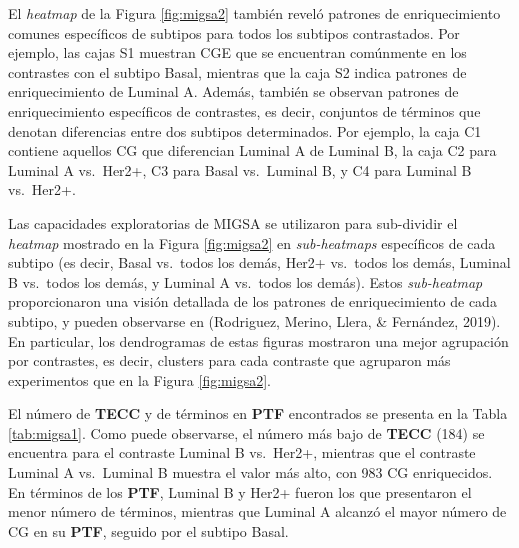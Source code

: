 \documentclass[12pt,twoside]{reedthesis}
\begin{document}
\par

El \emph{heatmap} de la Figura \ref{fig:migsa2} también reveló patrones de enriquecimiento comunes específicos de subtipos para todos los subtipos contrastados. Por ejemplo, las cajas S1 muestran CGE que se encuentran comúnmente en los contrastes con el subtipo Basal, mientras que la caja S2 indica patrones de enriquecimiento de Luminal A. Además, también se observan patrones de enriquecimiento específicos de contrastes, es decir, conjuntos de términos que denotan diferencias entre dos subtipos determinados. Por ejemplo, la caja C1 contiene aquellos CG que diferencian Luminal A de Luminal B, la caja C2 para Luminal A vs.~Her2+, C3 para Basal vs.~Luminal B, y C4 para Luminal B vs.~Her2+.

\par

Las capacidades exploratorias de MIGSA se utilizaron para sub-dividir el \emph{heatmap} mostrado en la Figura \ref{fig:migsa2} en \emph{sub-heatmaps} específicos de cada subtipo (es decir, Basal vs.~todos los demás, Her2+ vs.~todos los demás, Luminal B vs.~todos los demás, y Luminal A vs.~todos los demás). Estos \emph{sub-heatmap} proporcionaron una visión detallada de los patrones de enriquecimiento de cada subtipo, y pueden observarse en (Rodriguez, Merino, Llera, \& Fernández, 2019). En particular, los dendrogramas de estas figuras mostraron una mejor agrupación por contrastes, es decir, clusters para cada contraste que agruparon más experimentos que en la Figura \ref{fig:migsa2}.

\par

El número de \textbf{TECC} y de términos en \textbf{PTF} encontrados se presenta en la Tabla \ref{tab:migsa1}. Como puede observarse, el número más bajo de \textbf{TECC} (184) se encuentra para el contraste Luminal B vs.~Her2+, mientras que el contraste Luminal A vs.~Luminal B muestra el valor más alto, con 983 CG enriquecidos. En términos de los \textbf{PTF}, Luminal B y Her2+ fueron los que presentaron el menor número de términos, mientras que Luminal A alcanzó el mayor número de CG en su \textbf{PTF}, seguido por el subtipo Basal.
\end{document}

